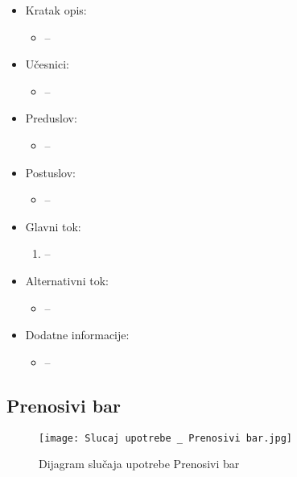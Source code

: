 \documentclass[a4paper]{article}
\begin{document}
\begin{itemize}
    \item Kratak opis:
        \begin{itemize}
            \item --
        \end{itemize}
    \item Učesnici:
        \begin{itemize}
            \item --
        \end{itemize}
    \item Preduslov:
        \begin{itemize}
            \item --
        \end{itemize}
    \item Postuslov:
        \begin{itemize}
            \item --
        \end{itemize}
    \item Glavni tok:
        \begin{enumerate}
            \item  --
        \end{enumerate}
    \item Alternativni tok:
        \begin{itemize}
            \item --
        \end{itemize}
    \item Dodatne informacije:
        \begin{itemize}
            \item --
        \end{itemize}
\end{itemize}



\subsection{Prenosivi bar}


\begin{figure}[htp]
    \centering
    \texttt{[image: Slucaj upotrebe \_ Prenosivi bar.jpg]}
    \caption{Dijagram slučaja upotrebe Prenosivi bar}
    \label{fig:PrenosiviBar}
\end{figure}
\end{document}
